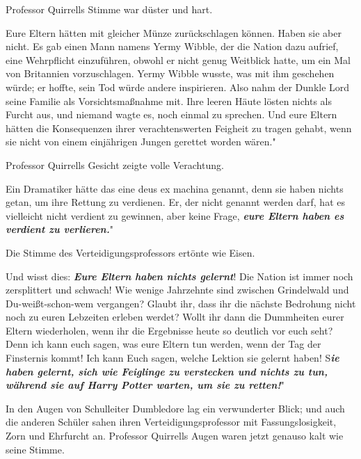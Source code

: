 Professor Quirrells Stimme war düster und hart.

\glqq{}Eure Eltern hätten mit gleicher Münze zurückschlagen können. Haben sie
aber nicht. Es gab einen Mann namens Yermy Wibble, der die Nation dazu aufrief,
eine Wehrpflicht einzuführen, obwohl er nicht genug Weitblick hatte, um ein Mal
von Britannien vorzuschlagen. Yermy Wibble wusste, was mit ihm geschehen würde;
er hoffte, sein Tod würde andere inspirieren. Also nahm der Dunkle Lord seine
Familie als Vorsichtsmaßnahme mit. Ihre leeren Häute lösten nichts als Furcht
aus, und niemand wagte es, noch einmal zu sprechen. Und eure Eltern hätten die
Konsequenzen ihrer verachtenswerten Feigheit zu tragen gehabt, wenn sie nicht
von einem einjährigen Jungen gerettet worden wären."

Professor Quirrells Gesicht zeigte volle Verachtung.

\glqq{}Ein Dramatiker hätte das eine deus ex machina genannt, denn sie haben
nichts getan, um ihre Rettung zu verdienen. Er, der nicht genannt werden darf,
hat es vielleicht nicht verdient zu gewinnen, aber keine Frage,
\textbf{\emph{eure Eltern haben es verdient zu verlieren.}}"

Die Stimme des Verteidigungsprofessors ertönte wie Eisen.

\glqq{}Und wisst dies: \textbf{\emph{Eure Eltern haben nichts gelernt}}! Die
Nation ist immer noch zersplittert und schwach! Wie wenige Jahrzehnte sind
zwischen Grindelwald und Du-weißt-schon-wem vergangen? Glaubt ihr, dass ihr die
nächste Bedrohung nicht noch zu euren Lebzeiten erleben werdet? Wollt ihr dann
die Dummheiten eurer Eltern wiederholen, wenn ihr die Ergebnisse heute so
deutlich vor euch seht? Denn ich kann euch sagen, was eure Eltern tun werden,
wenn der Tag der Finsternis kommt! Ich kann Euch sagen, welche Lektion sie
gelernt haben! S\textbf{\emph{ie haben gelernt, sich wie Feiglinge zu verstecken
und nichts zu tun, während sie auf Harry Potter warten, um sie zu retten!}}"

In den Augen von Schulleiter Dumbledore lag ein verwunderter Blick; und auch die
anderen Schüler sahen ihren Verteidigungsprofessor mit Fassungslosigkeit, Zorn
und Ehrfurcht an. Professor Quirrells Augen waren jetzt genauso kalt wie seine
Stimme.


